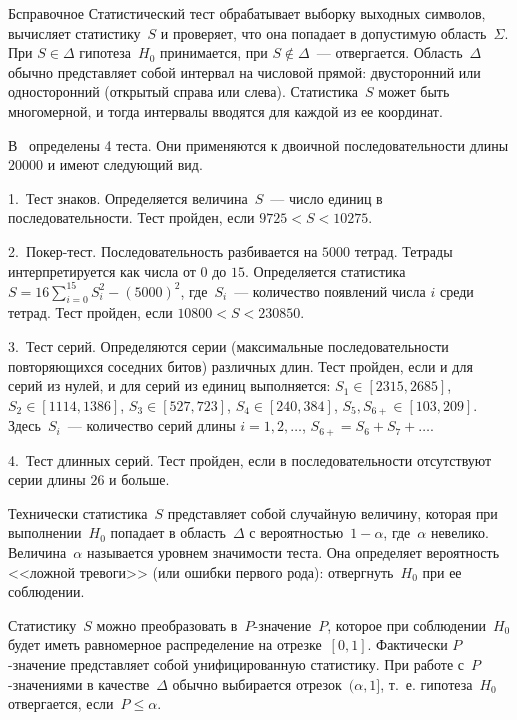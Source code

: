 \begin{appendix}{Б}{справочное}
Статистический тест обрабатывает выборку выходных символов, 
вычисляет статистику~$S$ и проверяет, что она попадает
в допустимую область~$\Sigma$. При $S\in\Delta$ гипотеза~$H_0$ принимается,
при $S\notin\Delta$~--- отвергается. Область~$\Delta$ обычно представляет
собой интервал на числовой прямой: двусторонний или односторонний 
(открытый справа или слева). Статистика~$S$ может быть многомерной,
и тогда интервалы вводятся для каждой из ее координат.

\begin{example}
В~\cite{FIPS140-2} определены 4 теста. Они применяются к двоичной 
последовательности длины $20000$ и имеют следующий вид.

1.~Тест знаков. Определяется величина~$S$~--- 
число единиц в последовательности. 
Тест пройден, если $9725<S<10275$.

2.~Покер-тест. Последовательность разбивается на $5000$ тетрад.
Тетрады интерпретируется как числа от $0$ до $15$.
Определяется статистика~$S=16\sum_{i=0}^{15}S_i^2-(5000)^2$,
где~$S_i$~--- количество появлений числа $i$ среди тетрад.
Тест пройден, если $10800<S<230850$.

3.~Тест серий. Определяются серии (максимальные последовательности 
повторяющихся соседних битов) различных длин. 
Тест пройден, если и для серий из нулей, и для серий из единиц выполняется: 
$S_1\in[2315,2685]$,
$S_2\in[1114,1386]$,
$S_3\in[527,723]$,
$S_4\in[240,384]$,
$S_5,S_{6+}\in[103,209]$.
Здесь~$S_i$~--- количество серий длины $i=1,2,\ldots$, 
$S_{6+}=S_6+S_7+\ldots$.

4.~Тест длинных серий. Тест пройден, если в последовательности отсутствуют 
серии длины $26$ и больше.
\end{example}

Технически статистика~$S$ представляет собой случайную величину, 
которая при выполнении~$H_0$ попадает в область~$\Delta$ 
с вероятностью~$1-\alpha$, где~$\alpha$ невелико.
%
Величина~$\alpha$ называется уровнем значимости теста. 
%
Она определяет вероятность <<ложной тревоги>> (или ошибки первого рода): 
отвергнуть~$H_0$ при ее соблюдении.

Статистику~$S$ можно преобразовать в~$P$-значение~$P$, 
которое при соблюдении~$H_0$ будет иметь равномерное распределение на 
отрезке~$[0,1]$. Фактически $P$-значение представляет собой унифицированную 
статистику. При работе с~$P$-значениями в качестве~$\Delta$ обычно выбирается
отрезок~$(\alpha,1]$, т.~е. гипотеза~$H_0$ отвергается, если~$P\leq\alpha$.


\end{appendix}
